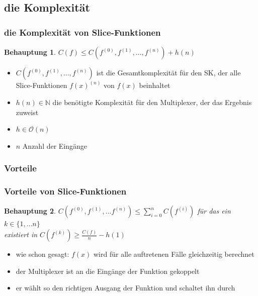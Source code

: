 \documentclass[hyperref={pdfpagelabels=false}]{beamer} %
\newtheorem{beh}{Behauptung}
\begin{document}
\subsection{die Komplexität}
\begin{frame}%
 \frametitle{die Komplexität von Slice-Funktionen}
\begin{beh}
	$C(f) \leq C(f^{(0)}, f^{(1)}, \dots ,f^{(n)})+h(n)$\\
\end{beh}
\begin{itemize}
 \item $C(f^{(0)}, f^{(1)}, \dots ,f^{(n)})$ ist die Gesamtkomplexität für den SK, der alle Slice-Funktionen $f(x)^{(n)}$ von $f(x)$ beinhaltet
 \item $h(n) \in \mathbb{N}$ die benötigte Komplexität für den Multiplexer, der das Ergebnis zuweist
 \item $h \in \mathcal{O}(n)$
 \item $n$ Anzahl der Eingänge
\end{itemize}
%
\end{frame}

\subsubsection*{Vorteile}
\begin{frame}
 \frametitle{Vorteile von Slice-Funktionen}
\begin{beh}
  $C(f^{(0)}, f^{(1)}, \dots f^{(n)}) \leq \sum_{i=0}^{n}{C(f^{(i)})}$ für das ein $k \in \{1, \dots n\}$\\
  existiert in $C(f^{(k)}) \geq \frac{C(f)}{n} - h(1)$
\end{beh}
\begin{itemize}
 \item wie schon gesagt: $f(x)$ wird für alle auftretenen Fälle gleichzeitig berechnet
 \item der Multiplexer ist an die Eingänge der Funktion gekoppelt
 \item er wählt so den richtigen Ausgang der Funktion und schaltet ihn durch
\end{itemize}
\end{frame}
\end{document}
